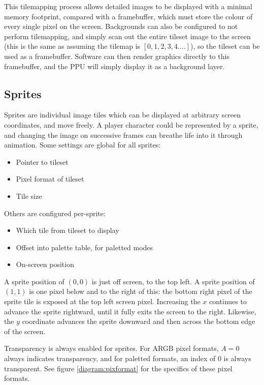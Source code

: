 This tilemapping process allows detailed images to be displayed with a minimal memory footprint, compared with a framebuffer, which must store the colour of every single pixel on the screen. Backgrounds can also be configured to not perform tilemapping, and simply scan out the entire tileset image to the screen (this is the same as assuming the tilemap is $[0, 1, 2, 3, 4....]$), so the tileset can be used as a framebuffer. Software can then render graphics directly to this framebuffer, and the PPU will simply display it as a background layer.

\subsection{Sprites}

Sprites are individual image tiles which can be displayed at arbitrary screen coordinates, and move freely. A player character could be represented by a sprite, and changing the image on successive frames can breathe life into it through animation. Some settings are global for all sprites:

\begin{itemize}
	\item Pointer to tileset
	\item Pixel format of tileset
	\item Tile size
\end{itemize}

Others are configured per-sprite:

\begin{itemize}
	\item Which tile from tileset to display
	\item Offset into palette table, for paletted modes
	\item On-screen position
\end{itemize}

A sprite position of $(0, 0)$ is just off screen, to the top left. A sprite position of $(1, 1)$ is one pixel below and to the right of this: the bottom right pixel of the sprite tile is exposed at the top left screen pixel. Increasing the $x$ continues to advance the sprite rightward, until it fully exits the screen to the right. Likewise, the $y$ coordinate advances the sprite downward and then across the bottom edge of the screen.

Transparency is always enabled for sprites. For ARGB pixel formats, $A=0$ always indicates transparency, and for paletted formats, an index of 0 is always transparent. See figure \ref{diagram:pixformat} for the specifics of these pixel formats.

